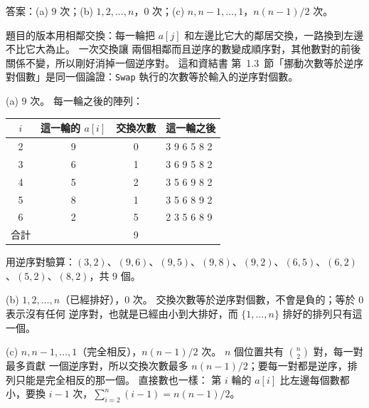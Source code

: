 \begin{pastsoln}
答案：(a) $9$ 次；(b) $1, 2, \ldots, n$，$0$ 次；(c) $n, n-1, \ldots, 1$，$n(n-1)/2$ 次。

題目的版本用相鄰交換：每一輪把 $a[j]$ 和左邊比它大的鄰居交換，一路換到左邊不比它大為止。 一次交換讓
兩個相鄰而且逆序的數變成順序對，其他數對的前後關係不變，所以剛好消掉一個逆序對。 這和資結書
第~1.3~節「挪動次數等於逆序對個數」是同一個論證：\texttt{Swap} 執行的次數等於輸入的逆序對個數。

(a) $9$ 次。 每一輪之後的陣列：
\begin{center}
\begin{tabular}{cccl}
\toprule
$i$ & 這一輪的 $a[i]$ & 交換次數 & 這一輪之後 \\
\midrule
2 & 9 & 0 & 3 9 6 5 8 2 \\
3 & 6 & 1 & 3 6 9 5 8 2 \\
4 & 5 & 2 & 3 5 6 9 8 2 \\
5 & 8 & 1 & 3 5 6 8 9 2 \\
6 & 2 & 5 & 2 3 5 6 8 9 \\
\midrule
合計 & & 9 & \\
\bottomrule
\end{tabular}
\end{center}
用逆序對驗算：$(3,2)$、$(9,6)$、$(9,5)$、$(9,8)$、$(9,2)$、$(6,5)$、$(6,2)$、$(5,2)$、$(8,2)$，共 $9$ 個。

(b) $1, 2, \ldots, n$（已經排好），$0$ 次。 交換次數等於逆序對個數，不會是負的；等於 $0$ 表示沒有任何
逆序對，也就是已經由小到大排好，而 $\{1, \ldots, n\}$ 排好的排列只有這一個。

(c) $n, n-1, \ldots, 1$（完全相反），$n(n-1)/2$ 次。 $n$ 個位置共有 $\binom{n}{2}$ 對，每一對最多貢獻
一個逆序對，所以交換次數最多 $n(n-1)/2$；要每一對都是逆序，排列只能是完全相反的那一個。 直接數也一樣：
第 $i$ 輪的 $a[i]$ 比左邊每個數都小，要換 $i - 1$ 次，$\sum_{i=2}^{n} (i - 1) = n(n-1)/2$。
\end{pastsoln}
